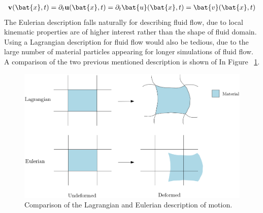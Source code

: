 \begin{align*}
\textbf{v}(\bat{x},t) = \partial_t \mathbf{u}(\bat{x},t) = \partial_t \bat{u}(\bat{x},t) = \bat{v}(\bat{x},t)
\end{align*}
The Eulerian description falls naturally for describing fluid flow, due to local kinematic properties are of higher interest rather than the shape of fluid domain. Using a Lagrangian description for fluid flow would also be tedious, due to the large number of material particles appearing for longer simulations of fluid flow. A comparison of the two previous mentioned description is shown of In Figure ~\ref{fig:lageul}.
\begin{figure}[h!]
  \centering
    \includegraphics[scale=0.28]{./Fig/lageul.png}
      \caption{Comparison of the Lagrangian and Eulerian description of motion.}
      \label{fig:lageul}
\end{figure}
